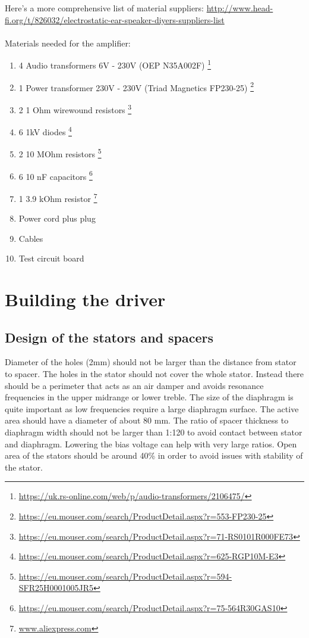 \documentclass{article}
\begin{document}
Here's a more comprehensive list of material suppliers: \url{http://www.head-fi.org/t/826032/electrostatic-ear-speaker-diyers-suppliers-list}
\\
\\
Materials needed for the amplifier:
\begin{enumerate}
    \item 4 Audio transformers 6V - 230V (OEP N35A002F) \footnote{\url{https://uk.rs-online.com/web/p/audio-transformers/2106475/}}
    \item 1 Power transformer 230V - 230V (Triad Magnetics FP230-25) \footnote{\url{https://eu.mouser.com/search/ProductDetail.aspx?r=553-FP230-25}}
    \item 2 1 Ohm wirewound resistors \footnote{\url{https://eu.mouser.com/search/ProductDetail.aspx?r=71-RS0101R000FE73}}
    \item 6 1kV diodes \footnote{\url{https://eu.mouser.com/search/ProductDetail.aspx?r=625-RGP10M-E3}}
    \item 2 10 MOhm resistors \footnote{\url{https://eu.mouser.com/search/ProductDetail.aspx?r=594-SFR25H0001005JR5}}
    \item 6 10 nF capacitors \footnote{\url{https://eu.mouser.com/search/ProductDetail.aspx?r=75-564R30GAS10}}
    \item 1 3.9 kOhm resistor \footnote{\url{www.aliexpress.com}}
    \item Power cord plus plug
    \item Cables
    \item Test circuit board
\end{enumerate}

\section{Building the driver}
\label{s:driver}

\subsection{Design of the stators and spacers}
\label{s:driver:design}
Diameter of the holes (2mm) should not be larger than the distance from stator to spacer. The holes in the stator should not cover the whole stator. Instead there should be a perimeter that acts as an air damper and avoids resonance frequencies in the upper midrange or lower treble. The size of the diaphragm is quite important as low frequencies require a large diaphragm surface. The active area should have a diameter of about 80 mm. The ratio of spacer thickness to diaphragm width should not be larger than 1:120 to avoid contact between stator and diaphragm. Lowering the bias voltage can help with very large ratios. Open area of the stators should be around 40\% in order to avoid issues with stability of the stator.
\end{document}
